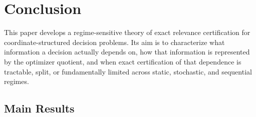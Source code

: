 \section{Conclusion}

This paper develops a regime-sensitive theory of exact relevance certification for coordinate-structured decision problems. Its aim is to characterize what information a decision actually depends on, how that information is represented by the optimizer quotient, and when exact certification of that dependence is tractable, split, or fundamentally limited across static, stochastic, and sequential regimes.

\subsection*{Main Results}

